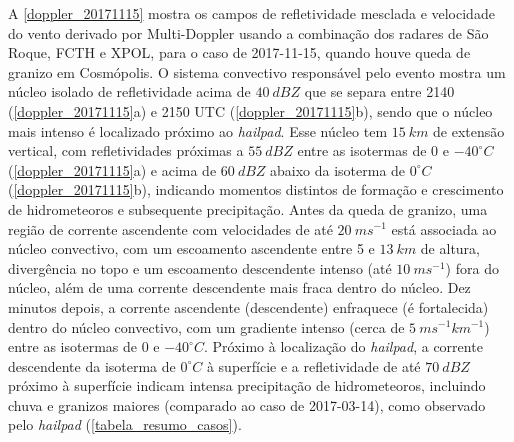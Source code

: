 A \autoref{doppler_20171115} mostra os campos de refletividade mesclada e velocidade do vento derivado por Multi-Doppler usando a combinação dos radares de São Roque, FCTH e XPOL, para o caso de 2017-11-15, quando houve queda de granizo em Cosmópolis. O sistema convectivo responsável pelo evento mostra um núcleo isolado de refletividade acima de $40\:dBZ$ que se separa entre 2140 (\autoref{doppler_20171115}a) e 2150 UTC (\autoref{doppler_20171115}b), sendo que o núcleo mais intenso é localizado próximo ao \textit{hailpad}. Esse núcleo tem $15\:km$ de extensão vertical, com refletividades próximas a $55\:dBZ$ entre as isotermas de 0 e $-40^{\circ}C$ (\autoref{doppler_20171115}a) e acima de $60\:dBZ$ abaixo da isoterma de $0^{\circ}C$ (\autoref{doppler_20171115}b), indicando momentos distintos de formação e crescimento de hidrometeoros e subsequente precipitação. Antes da queda de granizo, uma região de corrente ascendente com velocidades de até $20\:ms^{-1}$ está associada ao núcleo convectivo, com um escoamento ascendente entre 5 e $13\:km$ de altura, divergência no topo e um escoamento descendente intenso (até $10\:ms^{-1}$) fora do núcleo, além de uma corrente descendente mais fraca dentro do núcleo. Dez minutos depois, a corrente ascendente (descendente) enfraquece (é fortalecida) dentro do núcleo convectivo, com um gradiente intenso (cerca de $5\:ms^{-1}km^{-1}$) entre as isotermas de 0 e $-40^{\circ}C$. Próximo à localização do \textit{hailpad}, a corrente descendente da isoterma de $0^{\circ}C$ à superfície e a refletividade de até $70\:dBZ$ próximo à superfície indicam intensa precipitação de hidrometeoros, incluindo chuva e granizos maiores (comparado ao caso de 2017-03-14), como observado pelo \textit{hailpad} (\autoref{tabela_resumo_casos}).

